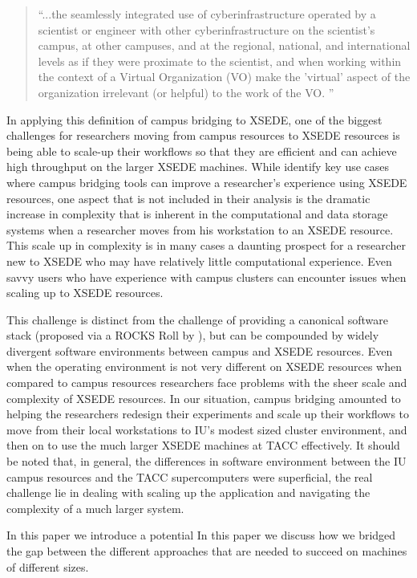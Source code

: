 \documentclass{sig-alternate}
\begin{document}
\begin{quotation}
``...the seamlessly integrated use of cyberinfrastructure operated by a scientist or engineer
with other cyberinfrastructure on the scientist's campus, at other campuses, and at the regional, national,
and international levels as if they were proximate to the scientist, and when working within the context of a
Virtual Organization (VO) make the 'virtual' aspect of the organization irrelevant (or helpful) to the work of
the VO. \cite{stewart2012}''
\end{quotation}

In applying this definition of campus bridging to XSEDE, one of the biggest challenges for researchers moving
from campus resources to XSEDE resources is being able to scale-up their workflows so that they are efficient
and can achieve high throughput on the larger XSEDE machines. While \citeauthor{stewart2012} identify key use
cases where campus bridging tools can improve a researcher's experience using XSEDE resources, one aspect that
is not included in their analysis is the dramatic increase in complexity that is inherent in the computational
and data storage systems when a researcher moves from his workstation to an XSEDE resource. This scale up in
complexity is in many cases a daunting prospect for a researcher new to XSEDE who may have relatively little
computational experience. Even savvy users who have experience with campus clusters can encounter issues when
scaling up to XSEDE resources.

This challenge is distinct from the challenge of providing a canonical software stack (proposed via a ROCKS
Roll by \citeauthor{stewart2012}), but can be compounded by widely divergent software environments between
campus and XSEDE resources. Even when the operating environment is not very different on XSEDE resources when
compared to campus resources researchers face problems with the sheer scale and complexity of XSEDE
resources. In our situation, campus bridging amounted to helping the researchers redesign their experiments
and scale up their workflows to move from their local workstations to IU's modest sized cluster environment,
and then on to use the much larger XSEDE machines at TACC effectively. It should be noted that, in general,
the differences in software environment between the IU campus resources and the TACC supercomputers were
superficial, the real challenge lie in dealing with scaling up the application and navigating the complexity
of a much larger system. 

In this paper we introduce a potential   In this paper we discuss how we bridged
the gap between the different approaches that are needed to succeed on machines of different sizes.
\end{document}

